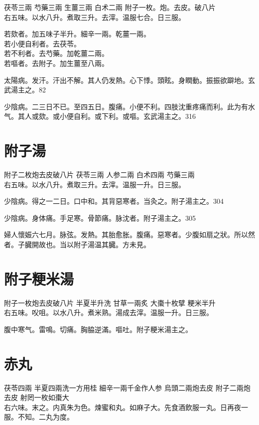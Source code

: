 茯苓{\scriptsize 三兩} 芍藥{\scriptsize 三兩} 生薑{\scriptsize 三兩} 白术{\scriptsize 二兩} 附子{\scriptsize 一枚。炮。去皮。破八片}\\
右五味。以水八升。煮取三升。去滓。温服七合。日三服。

若欬者。加五味子半升。細辛一兩。乾薑一兩。\\
若小便自利者。去茯苓。\\
若不利者。去芍藥。加乾薑二兩。\\
若嘔者。去附子。加生薑至八兩。

太陽病。发汗。汗出不解。其人仍发熱。心下悸。頭眩。身瞤動。振振欲躃地。玄武湯主之。82

少陰病。二三日不已。至四五日。腹痛。小便不利。四肢沈重疼痛而利。此为有水气。其人或欬。或小便{\khaai 自}利。或下利。或嘔。玄武湯主之。316

\section{附子湯}

附子{\scriptsize 二枚炮去皮破八片} 茯苓{\scriptsize 三兩} 人参{\scriptsize 二兩} 白术{\scriptsize 四兩} 芍藥{\scriptsize 三兩}\\
右五味。以水八升。煮取三升。去滓。温服一升。日三服。

少陰病。得之一二日。口中和。其背惡寒者。当灸之。附子湯主之。304

少陰病。身体痛。手足寒。骨節痛。脉沈者。附子湯主之。305

婦人懷娠六七月。脉弦。发熱。其胎愈胀。腹痛。惡寒者。少腹如扇之狀。所以然者。子臓開故也。当以附子湯温其臓。{\scriptsize 方未見。}

\section{附子粳米湯}

附子{\scriptsize 一枚炮去皮破八片} 半夏{\scriptsize 半升洗} 甘草{\scriptsize 一兩炙} 大棗{\scriptsize 十枚擘} 粳米{\scriptsize 半升}\\
右五味。㕮咀。以水八升。煮米熟。湯成去滓。温服一升。日三服。

腹中寒气。雷鳴。切痛。胸脇逆滿。嘔吐。附子粳米湯主之。

\section{赤丸}

茯苓{\scriptsize 四兩} 半夏{\scriptsize 四兩洗一方用桂} 細辛{\scriptsize 一兩千金作人参} 烏頭{\scriptsize 二兩炮去皮} 附子{\scriptsize 二兩炮去皮} 射罔{\scriptsize 一枚如棗大}\\
右六味。末之。内真朱为色。煉蜜和丸。如麻子大。先食酒飲服一丸。日再夜一服。不知。二丸为度。

